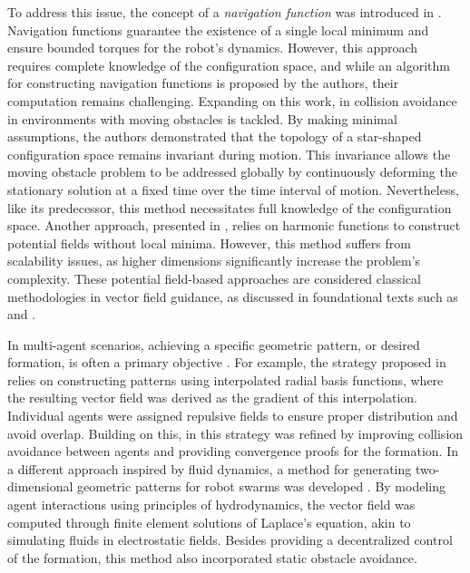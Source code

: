 To address this issue, the concept of a \emph{navigation function} was introduced in \citet{Rimon1992}. Navigation functions guarantee the existence of a single local minimum and ensure bounded torques for the robot's dynamics. However, this approach requires complete knowledge of the configuration space, and while an algorithm for constructing navigation functions is proposed by the authors, their computation remains challenging. Expanding on this work, in \citet{Conn1998} collision avoidance in environments with moving obstacles is tackled. By making minimal assumptions, the authors demonstrated that the topology of a star-shaped configuration space remains invariant during motion. This invariance allows the moving obstacle problem to be addressed globally by continuously deforming the stationary solution at a fixed time over the time interval of motion. Nevertheless, like its predecessor, this method necessitates full knowledge of the configuration space. Another approach, presented in \citep{Pimenta2006}, relies on harmonic functions to construct potential fields without local minima. However, this method suffers from scalability issues, as higher dimensions significantly increase the problem's complexity. These potential field-based approaches are considered classical methodologies in vector field guidance, as discussed in foundational texts such as \citet[p. 77]{Choset2005} and \citet[p. 299]{Spong2020}.

In multi-agent scenarios, achieving a specific geometric pattern, or desired formation, is often a primary objective \citep{Chaimowicz2005,Mong-yingA.Hsieh2006,Pimenta2007}. For example, the strategy proposed in \citet{Chaimowicz2005} relies on constructing patterns using interpolated radial basis functions, where the resulting vector field was derived as the gradient of this interpolation. Individual agents were assigned repulsive fields to ensure proper distribution and avoid overlap. Building on this, in \citet{Mong-yingA.Hsieh2006} this strategy was refined by improving collision avoidance between agents and providing convergence proofs for the formation. In a different approach inspired by fluid dynamics, a method for generating two-dimensional geometric patterns for robot swarms was developed \citep{Pimenta2007}. By modeling agent interactions using principles of hydrodynamics, the vector field was computed through finite element solutions of Laplace's equation, akin to simulating fluids in electrostatic fields. Besides providing a decentralized control of the formation, this method also incorporated static obstacle avoidance.

